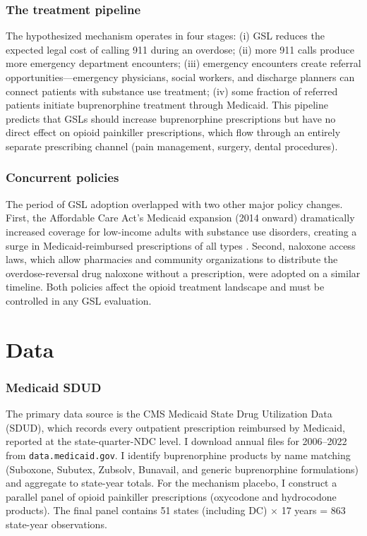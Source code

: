 \documentclass[12pt]{article}
\begin{document}
\subsubsection*{The treatment pipeline} The hypothesized mechanism operates in four stages: (i) GSL reduces the expected legal cost of calling 911 during an overdose; (ii) more 911 calls produce more emergency department encounters; (iii) emergency encounters create referral opportunities---emergency physicians, social workers, and discharge planners can connect patients with substance use treatment; (iv) some fraction of referred patients initiate buprenorphine treatment through Medicaid. This pipeline predicts that GSLs should increase buprenorphine prescriptions but have no direct effect on opioid painkiller prescriptions, which flow through an entirely separate prescribing channel (pain management, surgery, dental procedures).

\subsubsection*{Concurrent policies} The period of GSL adoption overlapped with two other major policy changes. First, the Affordable Care Act's Medicaid expansion (2014 onward) dramatically increased coverage for low-income adults with substance use disorders, creating a surge in Medicaid-reimbursed prescriptions of all types \citep{wen2017}. Second, naloxone access laws, which allow pharmacies and community organizations to distribute the overdose-reversal drug naloxone without a prescription, were adopted on a similar timeline. Both policies affect the opioid treatment landscape and must be controlled in any GSL evaluation.

\section{Data}

\subsubsection*{Medicaid SDUD} The primary data source is the CMS Medicaid State Drug Utilization Data (SDUD), which records every outpatient prescription reimbursed by Medicaid, reported at the state-quarter-NDC level. I download annual files for 2006--2022 from \texttt{data.medicaid.gov}. I identify buprenorphine products by name matching (Suboxone, Subutex, Zubsolv, Bunavail, and generic buprenorphine formulations) and aggregate to state-year totals. For the mechanism placebo, I construct a parallel panel of opioid painkiller prescriptions (oxycodone and hydrocodone products). The final panel contains 51 states (including DC) $\times$ 17 years = 863 state-year observations.
\end{document}
